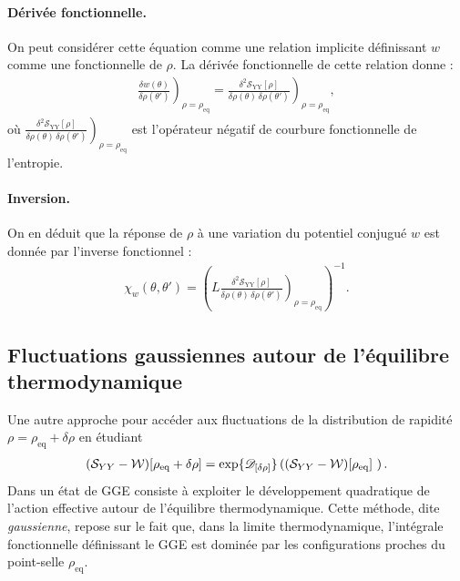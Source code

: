 \medskip
\paragraph{Dérivée fonctionnelle.}
On peut considérer cette équation comme une relation implicite définissant $w$ comme une fonctionnelle de $\rho$. La dérivée fonctionnelle de cette relation donne :
\begin{eqnarray}
	\left.\frac{\delta w(\theta)}{\delta \rho(\theta')}\right)_{\rho = \rho_{\mathrm{eq}}} = \left. \frac{\delta^2 \mathcal{S}_{\mathrm{YY}}[\rho]}{\delta \rho(\theta)\, \delta \rho(\theta')} \right)_{\rho = \rho_{\mathrm{eq}}},
\end{eqnarray}
où $\left. \frac{\delta^2 \mathcal{S}_{\mathrm{YY}}[\rho]}{\delta \rho(\theta)\, \delta \rho(\theta')} \right)_{\rho = \rho_{\mathrm{eq}}}$ est l'opérateur négatif de courbure fonctionnelle de l'entropie.

\paragraph{Inversion.}
On en déduit que la réponse de $\rho$ à une variation du potentiel conjugué $w$ est donnée par l'inverse fonctionnel :
\begin{eqnarray}
	\chi_w(\theta, \theta') = \left( L \left. \frac{\delta^2 \mathcal{S}_{\mathrm{YY}}[\rho]}{\delta \rho(\theta)\, \delta \rho(\theta')} \right)_{\rho = \rho_{\mathrm{eq}}} \right)^{-1}.
\end{eqnarray}


\subsection{Fluctuations gaussiennes autour de l’équilibre thermodynamique}

Une autre approche pour accéder aux fluctuations de la distribution de rapidité $\rho = \rho_{\mathrm{eq}} + \delta \rho $  en étudiant 
\begin{eqnarray*}
	(\mathcal{S}_{YY} - \mathcal{W})[\rho_{\mathrm{eq}} + \delta \rho ]  = \exp \{\dfonc{\delta \rho }\}\left ( (\mathcal{S}_{YY} - \mathcal{W})[\rho_{\mathrm{eq}}] \right ).	
\end{eqnarray*}
Dans un état de GGE consiste à exploiter le développement quadratique de l’action effective autour de l’équilibre thermodynamique. Cette méthode, dite \emph{gaussienne}, repose sur le fait que, dans la limite thermodynamique, l’intégrale fonctionnelle définissant le GGE est dominée par les configurations proches du point-selle $\rho_{\mathrm{eq}}$.

